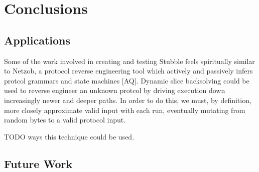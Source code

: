 \documentclass[11pt,expanded,copyright]{fsuthesis}
\begin{document}



\chapter{Conclusions}

\section{Applications}

Some of the work involved in creating and testing Stubble feels spiritually similar to Netzob, a protocol reverse engineering tool which actively and passively infers protcol grammars and state machines [AQ]. Dynamic slice backsolving could be used to reverse engineer an unknown protcol by driving execution down increasingly newer and deeper paths. In order to do this, we must, by definition, more closely approximate valid input with each run, eventually mutating from random bytes to a valid protocol input.

TODO ways this technique could be used.

\section{Future Work}
\end{document}
